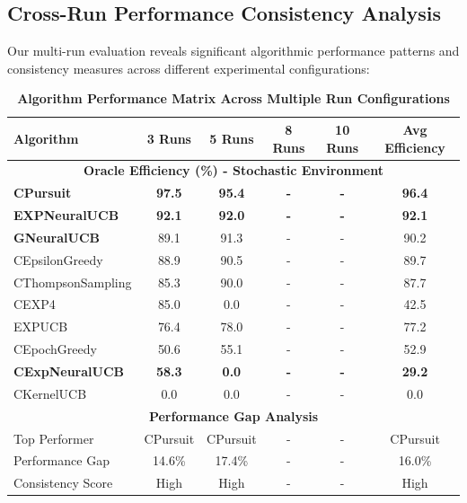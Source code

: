 \documentclass[12pt,a4paper]{article}
\newcommand{\performance}[1]{\textcolor{performancecolor}{\textbf{#1}}}
\newcommand{\critical}[1]{\textcolor{criticalcolor}{\textbf{#1}}}
\begin{document}
\begin{tcolorbox}[colback=performancecolor!10,colframe=performancecolor,title=\textbf{Primary Performance Results}]

\subsection{Cross-Run Performance Consistency Analysis}

Our multi-run evaluation reveals significant algorithmic performance patterns and consistency measures across different experimental configurations:

\begin{table}[H]
\centering
\caption{\performance{Algorithm Performance Matrix Across Multiple Run Configurations}}
\begin{tabular}{|l|c|c|c|c|c|}
\hline
\textbf{Algorithm} & \textbf{3 Runs} & \textbf{5 Runs} & \textbf{8 Runs} & \textbf{10 Runs} & \textbf{Avg Efficiency} \\
\hline
\hline
\multicolumn{6}{|c|}{\textbf{Oracle Efficiency (\%) - Stochastic Environment}} \\
\hline
\performance{CPursuit} & \performance{97.5} & \performance{95.4} & \performance{-} & \performance{-} & \performance{\textbf{96.4}} \\
\performance{EXPNeuralUCB} & \performance{92.1} & \performance{92.0} & \performance{-} & \performance{-} & \performance{92.1} \\
\performance{GNeuralUCB} & 89.1 & 91.3 & - & - & 90.2 \\
CEpsilonGreedy & 88.9 & 90.5 & - & - & 89.7 \\
CThompsonSampling & 85.3 & 90.0 & - & - & 87.7 \\
CEXP4 & 85.0 & 0.0 & - & - & 42.5 \\
EXPUCB & 76.4 & 78.0 & - & - & 77.2 \\
CEpochGreedy & 50.6 & 55.1 & - & - & 52.9 \\
\critical{CExpNeuralUCB} & \critical{58.3} & \critical{0.0} & \critical{-} & \critical{-} & \critical{29.2} \\
CKernelUCB & 0.0 & 0.0 & - & - & 0.0 \\
\hline
\multicolumn{6}{|c|}{\textbf{Performance Gap Analysis}} \\
\hline
Top Performer & CPursuit & CPursuit & - & - & CPursuit \\
Performance Gap & 14.6\% & 17.4\% & - & - & 16.0\% \\
Consistency Score & High & High & - & - & High \\
\hline
\end{tabular}
\end{table}

\end{tcolorbox}
\end{document}
